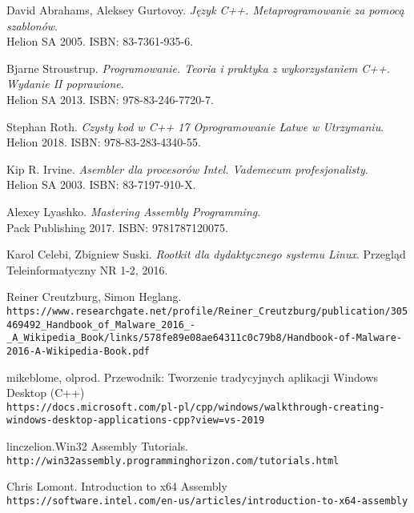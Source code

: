 \begin{thebibliography}{9}
David Abrahams, Aleksey Gurtovoy.
\textit{Język C++. Metaprogramowanie za pomocą szablonów}. 
\\ Helion SA 2005. ISBN: 83-7361-935-6.


Bjarne Stroustrup.
\textit{Programowanie. Teoria i praktyka z wykorzystaniem C++. Wydanie II poprawione}. 
\\ Helion SA 2013. ISBN: 978-83-246-7720-7.


Stephan Roth.
\textit{Czysty kod w C++ 17 Oprogramowanie Łatwe w Utrzymaniu}. 
\\Helion 2018. ISBN: 978-83-283-4340-55.


Kip R. Irvine.
\textit{Asembler dla procesorów Intel. Vademecum profesjonalisty}. 
\\ Helion SA 2003. ISBN: 83-7197-910-X.


Alexey Lyashko.
\textit{Mastering Assembly Programming}. 
\\Pack Publishing 2017. ISBN: 9781787120075.



Karol Celebi, Zbigniew Suski.
\textit{Rootkit dla dydaktycznego systemu Linux}. 
Przegląd Teleinformatyczny NR 1-2, 2016.



Reiner Creutzburg, Simon Heglang.
\\\texttt{https://www.researchgate.net/profile/Reiner\_Creutzburg/publication/305469492\_Handbook\_of\_Malware\_2016\_-\_A\_Wikipedia\_Book/links/578fe89e08ae64311c0c79b8/Handbook-of-Malware-2016-A-Wikipedia-Book.pdf}


mikeblome, olprod. Przewodnik: Tworzenie tradycyjnych aplikacji Windows Desktop (C++)
\\\texttt{https://docs.microsoft.com/pl-pl/cpp/windows/walkthrough-creating-windows-desktop-applications-cpp?view=vs-2019}


linczelion.Win32 Assembly Tutorials.
\\\texttt{http://win32assembly.programminghorizon.com/tutorials.html}


Chris Lomont. Introduction to x64 Assembly
\\\texttt{https://software.intel.com/en-us/articles/introduction-to-x64-assembly}



\end{thebibliography}
